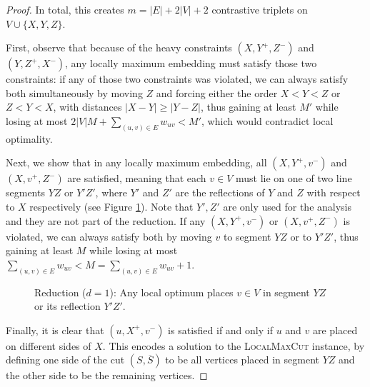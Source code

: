 \documentclass{article}
\theoremstyle{definition}  %
\theoremstyle{plain}
\numberwithin{observation}{section}
\numberwithin{claim}{section}
\numberwithin{fact}{section}
\numberwithin{lemma}{section}
\numberwithin{proposition}{section}
\numberwithin{theorem}{section}
\numberwithin{corollary}{section}
\numberwithin{definition}{section}
\renewcommand{\bar}[1]{\overline{#1}}
\theoremstyle{plain}
\begin{document}
\begin{proof}
In total, this creates $m=|E|+2|V|+2$ contrastive triplets on $V\cup\{X,Y,Z\}$. 

First, observe that because of the heavy constraints $(X, Y^+, Z^-)$ and $(Y, Z^+, X^-)$, any locally maximum embedding must satisfy those two constraints: if any of those two constraints was violated, we can always satisfy both simultaneously by moving $Z$ and forcing either the order $X < Y < Z$ or $Z < Y < X$, with distances $|X - Y| \geq |Y - Z|$, thus gaining at least $M'$ while losing at most $2 |V| M + \sum_{(u,v) \in E} w_{uv} < M'$, which would contradict local optimality.

Next, we show that in any locally maximum embedding, all $(X, Y^+, v^-)$ and $(X, v^+, Z^-)$ are satisfied, meaning that each $v \in V$ must lie on one of two line segments $YZ$ or $Y'Z'$, where $Y'$ and $Z'$ are the reflections of $Y$ and $Z$ with respect to $X$ respectively (see Figure \ref{fig:contrastive-1d}). Note that $Y',Z'$ are only used for the analysis and they are not part of the reduction. If any $(X, Y^+, v^-)$ or $(X, v^+, Z^-)$ is violated, we can always satisfy both by moving $v$ to segment $YZ$ or to $Y'Z'$, thus gaining at least $M$ while losing at most $\sum_{(u,v) \in E} w_{uv} < M = \sum_{(u,v) \in E} w_{uv} + 1$.


\begin{figure}[ht]
    \centering
    \caption{Reduction ($d=1$): Any local optimum places $v \in V$ in segment $YZ$ or its reflection $Y'Z'$.}
    \label{fig:contrastive-1d}
\end{figure}

Finally, it is clear that $(u, X^+, v^-)$ is satisfied if and only if $u$ and $v$ are placed on different sides of $X$. This encodes a solution to the \textsc{LocalMaxCut} instance, by defining one side of the cut $(S,\bar{S})$ to be all vertices placed in segment $YZ$ and the other side to be the remaining vertices. 
\end{proof}
\end{document}
